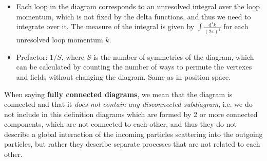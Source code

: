 \begin{itemize}
    \item Each loop in the diagram corresponds to an unresolved integral over the loop momentum, which is not fixed by the delta functions, and thus we need to integrate over it. The measure of the integral is given by \(\int \frac{\mathrm{d}^4 k}{(2\pi)^4}\) for each unresolved loop momentum \(k\).
    \item Prefactor: \(1/S\), where \(S\) is the number of symmetries of the diagram, which can be calculated by counting the number of ways to permute the vertexes and fields without changing the diagram. Same as in position space.
\end{itemize}

When saying \textbf{fully connected diagrams}, we mean that the diagram is connected and that it \textit{does not contain any disconnected subdiagram}, i.e. we do not include in this definition diagrams which are formed by 2 or more connected components, which are not connected to each other, and thus they do not describe a global interaction of the incoming particles scattering into the outgoing particles, but rather they describe separate processes that are not related to each other.

